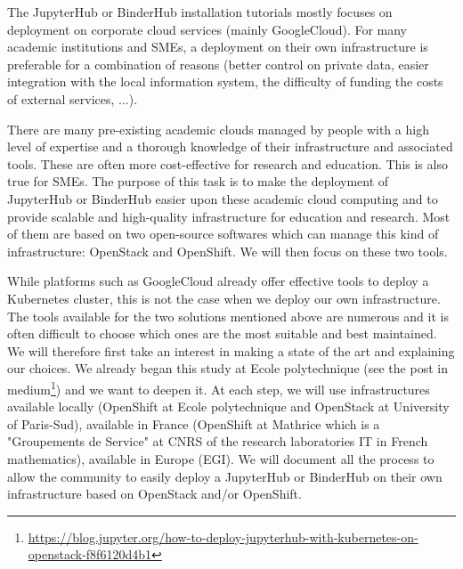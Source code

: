 \begin{task}[
  title=Easy deployment of JupyterHub and BinderHub on a variety of
  infrastructure,
  id=jh-bh-deplyment,
  lead=EP,
  PM=11PM, %
  wphases={0-18}, %
  partners={EP,UPSUD}] %

  The JupyterHub or BinderHub installation tutorials mostly focuses on
  deployment on corporate cloud services (mainly GoogleCloud). For many academic
  institutions and SMEs, a deployment on their own infrastructure is preferable
  for a combination of reasons (better control on private data, easier
  integration with the local information system, the difficulty of funding the
  costs of external services, ...).

  There are many pre-existing academic clouds managed by people with a high
  level of expertise and a thorough knowledge of their infrastructure and
  associated tools. These are often more cost-effective for research and
  education. This is also true for SMEs. The purpose of this task is to make the
  deployment of JupyterHub or BinderHub easier upon these academic cloud
  computing and to provide scalable and high-quality infrastructure for
  education and research. Most of them are based on two open-source softwares
  which can manage this kind of infrastructure: OpenStack and OpenShift. We will
  then focus on these two tools.
  
  While platforms such as GoogleCloud already offer effective tools to deploy a
  Kubernetes cluster, this is not the case when we deploy our own
  infrastructure. The tools available for the two solutions mentioned above are
  numerous and it is often difficult to choose which ones are the most suitable
  and best maintained. We will therefore first take an interest in making a
  state of the art and explaining our choices. We already began this study at
  Ecole polytechnique (see the post in
  medium\footnote{\url{https://blog.jupyter.org/how-to-deploy-jupyterhub-with-kubernetes-on-openstack-f8f6120d4b1}})
  and we want to deepen it. At each step, we will use infrastructures available
  locally (OpenShift at Ecole polytechnique and OpenStack at University of
  Paris-Sud), available in France (OpenShift at Mathrice which is a "Groupements
  de Service" at CNRS of the research laboratories IT in French mathematics),
  available in Europe (EGI). We will document all the process to allow the
  community to easily deploy a JupyterHub or BinderHub on their own
  infrastructure based on OpenStack and/or OpenShift.


\end{task}
